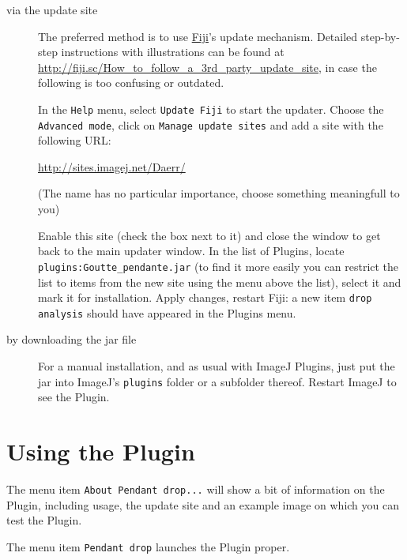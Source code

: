 \documentclass[fleqn]{scrartcl}
\begin{document}
\begin{description}
\item[via the update site] The preferred method is to use
  \href{http://fiji.sc/}{Fiji}'s \cite{FijiSite,Schindelin2012}
  update mechanism. Detailed step-by-step instructions with
  illustrations can be found at
  \url{http://fiji.sc/How_to_follow_a_3rd_party_update_site}, in case
  the following is too confusing or outdated.

  In the \texttt{Help} menu, select \texttt{Update Fiji} to start the
  updater. Choose the \texttt{Advanced mode}, click on \texttt{Manage
    update sites} and add a site with the following URL:
  \begin{center}
    \url{http://sites.imagej.net/Daerr/}
  \end{center}
  (The name has no particular importance, choose something meaningfull
  to you)

  Enable this site (check the box next to it) and close the window to
  get back to the main updater window. In the list of Plugins, locate
  \texttt{plugins:Goutte\_pendante.jar} (to find it more easily you can
  restrict the list to items from the new site using the menu above
  the list), select it and mark it for installation. Apply changes,
  restart Fiji: a new item \texttt{drop analysis} should have appeared
  in the Plugins menu.

\item[by downloading the jar file] For a manual installation, and as
  usual with ImageJ Plugins, just put the jar into ImageJ's
  \texttt{plugins} folder or a subfolder thereof. Restart ImageJ to
  see the Plugin.

\end{description}


\section{Using the Plugin}
\label{sec:usage}

The menu item \texttt{About Pendant drop...} will show a bit of
information on the Plugin, including usage, the update site and an
example image on which you can test the Plugin.

The menu item \texttt{Pendant drop} launches the Plugin proper.
\end{document}
